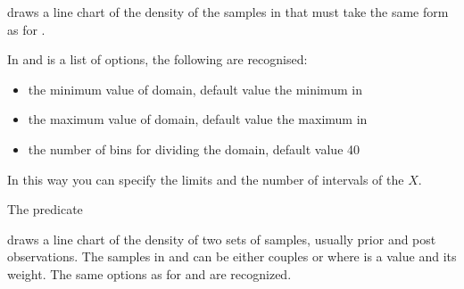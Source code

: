 \documentclass[letterpaper,10pt,english]{sphinxmanual}
\begin{document}
\sphinxAtStartPar
draws a line chart of the density of the samples in  that must take the same form as for .

\sphinxAtStartPar
In  and   is a list of options, the following are recognised:
\begin{itemize}
\item {} 
\sphinxAtStartPar
{} the minimum value of domain, default value the minimum in 

\item {} 
\sphinxAtStartPar
{} the maximum value of domain, default value the maximum in 

\item {} 
\sphinxAtStartPar
{} the number of bins for dividing the domain, default value 40

\end{itemize}

\sphinxAtStartPar
In this way you can specify the limits and the number of intervals of the \(X\).

\sphinxAtStartPar
The predicate

\begin{sphinxVerbatim}[commandchars=\\\{\}]
  
\end{sphinxVerbatim}

\sphinxAtStartPar
draws a line chart of the density of two sets of samples, usually prior and post observations. The samples in  and  can be either couples  or  where  is a value and  its weight.
The same options as for  and  are recognized.
\end{document}
